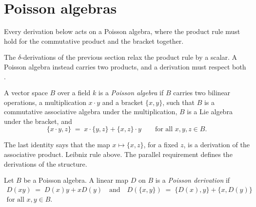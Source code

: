 \section{Poisson algebras}\label{sec:nonassociative:poisson}

Every derivation below acts on a Poisson algebra, where the product rule must
hold for the commutative product and the bracket together. %

The $\delta$-derivations of the previous section relax the product rule by a
scalar.
A Poisson algebra instead carries two products, and a derivation must
respect both \cite[p.~658]{AlbertiArestiLi2018Poisson}.

\begin{definition}
\label{def:nonassociative:poisson}
A vector space $B$ over a field $k$ is a \emph{Poisson algebra} if $B$
carries two bilinear operations, a multiplication $x\cdot y$ and a bracket
$\{x,y\}$, such that $B$ is a commutative associative algebra under the
multiplication, $B$ is a Lie algebra under the bracket, and
\[
\{x\cdot y,z\}\;=\;x\cdot\{y,z\}+\{x,z\}\cdot y
\qquad\text{for all }x,y,z\in B.
\]
\end{definition}

The last identity says that the map $x\mapsto\{x,z\}$, for a fixed $z$, is a
derivation of the associative product.
Leibniz rule above. The parallel requirement defines the derivations of the
structure.

\begin{definition}
\label{def:nonassociative:poisson-derivation}
Let $B$ be a Poisson algebra. A linear map $D$ on $B$ is a \emph{Poisson
derivation} if
\begin{gather*}
D(xy)\;=\;D(x)y+xD(y)
\quad\text{and}\quad
D(\{x,y\})\;=\;\{D(x),y\}+\{x,D(y)\}\\
\text{for all }x,y\in B.
\end{gather*}
\end{definition}

